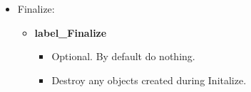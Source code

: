 \begin{itemize}
\begin{itemize}
    \begin{itemize}
      \item Optional. By default check the timestamp of all import fields against the current time of the internal clock.
    \end{itemize}
    \item {\bf label\_SetRunClock}
    \begin{itemize}
      \item Optional. By default do not adjust the internal clock when entering Run.
    \end{itemize}
    \item {\bf label\_TimestampExport}
    \begin{itemize}
      \item Optional. By default do not timestamp any fields.
    \end{itemize}
  \end{itemize}
  \item Finalize:
  \begin{itemize}
    \item {\bf label\_Finalize}
    \begin{itemize}
      \item Optional. By default do nothing.
      \item Destroy any objects created during Initalize.
    \end{itemize}
  \end{itemize}
\end{itemize}

\mbox{}\hrulefill\ 


